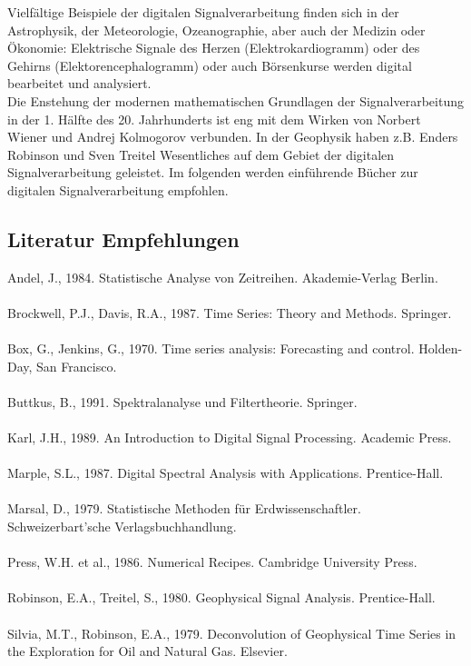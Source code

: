Vielfältige Beispiele der digitalen Signalverarbeitung finden sich in der Astrophysik, der Meteorologie, Ozeanographie, aber auch der Medizin oder Ökonomie: Elektrische Signale des Herzen (Elektrokardiogramm) oder des Gehirns (Elektorencephalogramm) oder auch Börsenkurse werden digital bearbeitet und analysiert.\\
Die Enstehung der modernen mathematischen Grundlagen der Signalverarbeitung in der 1. Hälfte des 20. Jahrhunderts ist eng mit dem Wirken von Norbert Wiener und Andrej Kolmogorov verbunden. In der Geophysik haben z.B. Enders Robinson und Sven Treitel Wesentliches auf dem Gebiet der digitalen Signalverarbeitung geleistet. Im folgenden werden einführende Bücher zur digitalen Signalverarbeitung empfohlen.

\subsection*{Literatur Empfehlungen}
Andel, J., 1984. Statistische Analyse von Zeitreihen. Akademie-Verlag Berlin.\\\\
Brockwell, P.J., Davis, R.A., 1987. Time Series: Theory and Methods. Springer.\\\\
Box, G.,  Jenkins, G., 1970. Time series analysis: Forecasting and control. Holden-Day, San Francisco.\\\\
Buttkus, B., 1991. Spektralanalyse und Filtertheorie. Springer.\\\\
Karl, J.H., 1989. An Introduction to Digital Signal Processing. Academic Press.\\\\
Marple, S.L., 1987. Digital Spectral Analysis with Applications. Prentice-Hall.\\\\
Marsal, D., 1979. Statistische Methoden für Erdwissenschaftler. Schweizerbart’sche Verlagsbuchhandlung.\\\\
Press, W.H. et al., 1986. Numerical Recipes. Cambridge University Press.\\\\
Robinson, E.A., Treitel, S., 1980. Geophysical Signal Analysis. Prentice-Hall.\\\\
Silvia, M.T., Robinson, E.A., 1979. Deconvolution of Geophysical Time Series in the Exploration for Oil and Natural Gas. Elsevier.
 
